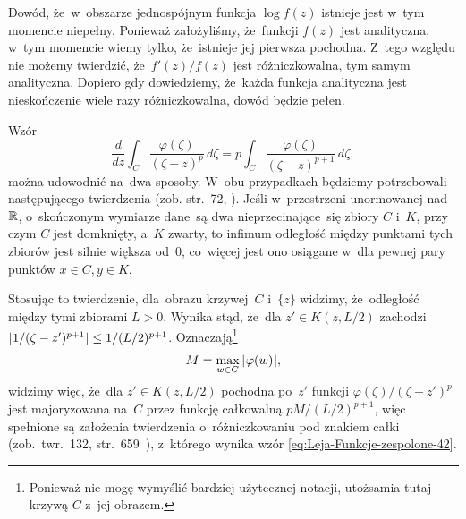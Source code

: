 \documentclass[a4paper,11pt]{article}
\numberwithin{equation}{section}
\begin{document}
\VerSpaceFour





\noindent
{} Dowód, że~w~obszarze jednospójnym funkcja $\log f( z )$ istnieje
jest w~tym momencie niepełny. Ponieważ założyliśmy, że~funkcji $f( z )$
jest analityczna, w~tym momencie wiemy tylko, że~istnieje jej pierwsza
pochodna. Z~tego względu nie możemy twierdzić, że~$f'( z ) / f( z )$ jest
różniczkowalna, tym samym analityczna. Dopiero gdy dowiedziemy, że~każda
funkcja analityczna jest nieskończenie wiele razy różniczkowalna, dowód
będzie pełen.

\VerSpaceFour





\noindent
{} Wzór
\begin{equation}
  \label{eq:Leja-Funkcje-zespolone-41}
  \frac{ d }{ dz } \int_{ C } \frac{ \varphi( \zeta ) }{ ( \zeta - z )^{ p } } \, d\zeta =
  p \int_{ C } \frac{ \varphi( \zeta ) }{ ( \zeta - z )^{ p + 1 } } \, d\zeta,
\end{equation}
można udowodnić na~dwa sposoby. W~obu przypadkach będziemy
potrzebowali następującego twierdzenia (zob. str.~72,
\cite{SchwartzKursAnalizyMatematycznejVolI1979}). Jeśli w~przestrzeni
unormowanej nad~$\mathbb{R}$, o~skończonym wymiarze dane~są dwa
nieprzecinające~się zbiory $C$ i~$K$, przy czym $C$ jest domknięty,
a~$K$ zwarty, to infimum odległość między punktami tych zbiorów jest
silnie większa od~$0$, co~więcej jest ono osiągane w~dla pewnej pary
punktów $x \in C, y \in K$.

Stosując to twierdzenie, dla~obrazu krzywej~$C$ i~$\{ z \}$ widzimy,
że~odległość między tymi zbiorami $L > 0$. Wynika stąd, że~dla
$z' \in K( z, L / 2 )$ zachodzi
$| \hspace{0.05em}  1 / ( \zeta - z' )^{ p + 1 }  \hspace{0.05em} | \leq 1 / ( L / 2 )^{ p + 1 }$.
Oznaczają\footnote{Ponieważ nie mogę wymyślić bardziej użytecznej
  notacji, utożsamia tutaj krzywą $C$ z~jej obrazem.}
\begin{equation}
  \label{eq:Leja-Funkcje-zespolone-42}
  M = \max_{ w \in C } | \hspace{0.05em}  \varphi( w )  \hspace{0.05em} |,
\end{equation}
widzimy więc, że~dla $z' \in K( z, L / 2 )$ pochodna po~$z'$ funkcji
$\varphi( \zeta ) / ( \zeta - z' )^{ p }$ jest majoryzowana na~$C$
przez funkcję całkowalną $p M / ( L / 2 )^{ p + 1 }$, więc spełnione
są założenia twierdzenia o~różniczkowaniu pod znakiem całki
(zob.~twr.~132,
str.~659~\cite{SchwartzKursAnalizyMatematycznejVolI1979}), z~którego
wynika wzór \eqref{eq:Leja-Funkcje-zespolone-42}.
\end{document}
